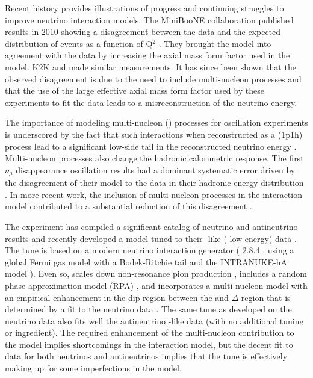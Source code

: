 Recent history provides illustrations of progress and continuing struggles to improve neutrino interaction models.  The MiniBooNE collaboration published results in 2010 showing a disagreement between the data and the expected distribution of  events as a function of Q$^{2}$ \cite{AguilarArevalo:2010cx,Gran:2006jn}.   They brought the model into agreement with the data by increasing the axial mass form factor used in the model.  K2K \cite{Gran:2006jn} and  \cite{Adamson:2014pgc} made similar measurements.  It has since been shown that the observed disagreement is due to the need to include multi-nucleon processes and that the use of the large effective axial mass form factor used by these experiments to fit the data leads to a misreconstruction of the neutrino energy.  

The importance of modeling multi-nucleon () processes for oscillation experiments is underscored by the fact that such interactions when reconstructed as a  (1p1h) process lead to a significant low-side tail in the reconstructed neutrino energy \cite{Martini:2012uc}.  Multi-nucleon processes also change the hadronic calorimetric response.  The first    $\nu_{\mu}$ disappearance oscillation results had a dominant systematic error driven by the disagreement of their model to the data in their hadronic energy distribution \cite{Adamson:2016xxw}.  In more recent work, the inclusion of multi-nucleon processes in the interaction model contributed to a substantial reduction of this disagreement \cite{NOvA:2018gge}.

The  experiment has compiled a significant catalog of neutrino and antineutrino results and recently developed a model tuned to their -like  ( low energy) data \cite{Ruterbories:2018gub}.  The tune is based on a modern neutrino interaction generator ( 2.8.4 \cite{Andreopoulos:2009rq}, using a global Fermi gas model \cite{Smith:1972xh}  with a Bodek-Ritchie tail \cite{Bodek:1981wr} and the INTRANUKE-hA  model \cite{Dytman:2007zz}).  Even so,  scales down non-resonance pion production \cite{Rodrigues:2016xjj}, includes a random phase approximation model (RPA) \cite{Nieves:2004wx,Gran:2017psn}, and incorporates a multi-nucleon model \cite{Nieves:2011pp, Gran:2013kda, Schwehr:2016pvn} with an empirical enhancement in the dip region between the  and $\Delta$  region that is determined by a fit to the neutrino data \cite{Ruterbories:2018gub}.  The same tune as developed on the neutrino data also fits well the  antineutrino -like data (with no additional tuning or ingredient).  The required enhancement of the multi-nucleon contribution to the model implies shortcomings in the interaction model, but the decent fit to data for both neutrinos and antineutrinos implies that the tune is effectively making up for some imperfections in the model. 

